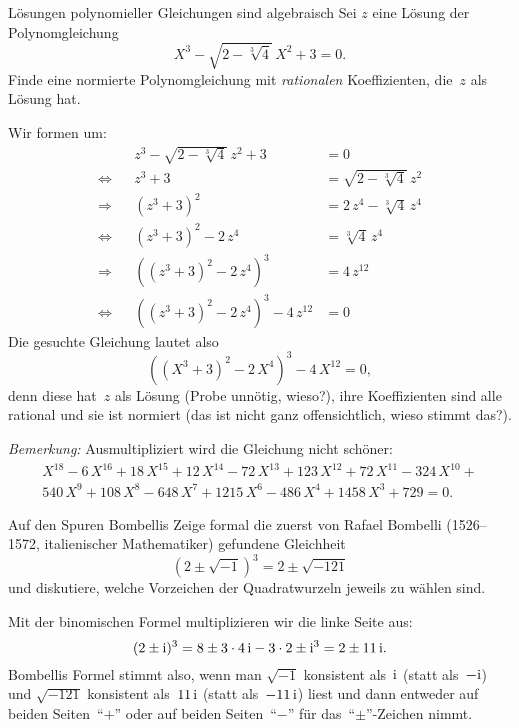 \documentclass{algblatt}
\begin{document}
\vspace*{-1.2cm}

\begin{aufgabe}{Lösungen polynomieller Gleichungen sind algebraisch}
Sei $z$ eine Lösung der Polynomgleichung
\[ X^3 - \sqrt{2 - \sqrt[3]{4}} \, X^2 + 3 = 0. \]
Finde eine normierte Polynomgleichung mit \emph{rationalen} Koeffizienten,
die~$z$ als Lösung hat.
\begin{loesung}
Wir formen um:
\begin{align*}
  &&z^3 - \sqrt{2 - \sqrt[3]{4}} \, z^2 + 3 &= 0 \\
  \Longleftrightarrow&&
  z^3 + 3 &= \sqrt{2 - \sqrt[3]{4}} \, z^2 \\
  \Longrightarrow&&
  (z^3 + 3)^2 &= 2 \, z^4 - \sqrt[3]{4} \, z^4 \\
  \Longleftrightarrow&&
  (z^3 + 3)^2 - 2 \, z^4 &= \sqrt[3]{4} \, z^4 \\
  \Longrightarrow&&
  ((z^3 + 3)^2 - 2 \, z^4)^3 &= 4 \, z^{12} \\
  \Longleftrightarrow&&
  ((z^3 + 3)^2 - 2 \, z^4)^3 - 4 \, z^{12} &= 0
\end{align*}
Die gesuchte Gleichung lautet also
\[ ((X^3 + 3)^2 - 2 \, X^4)^3 - 4 \, X^{12} = 0, \]
denn diese hat~$z$ als Lösung (Probe unnötig, wieso?), ihre Koeffizienten sind
alle rational und sie ist normiert (das ist nicht ganz offensichtlich, wieso
stimmt das?).

\emph{Bemerkung:} Ausmultipliziert wird die Gleichung nicht schöner:
\begin{multline*}
X^{18}-6\,X^{16}+18\,X^{15}+12\,X^{14}-72\,X^{13}+123\,X^{12}+72\,X^{11}-324\,X^{10}+\\540\,X^{9}
+
          108\,X^{8}-648\,X^{7}+1215\,X^{6}-486\,X^{4}+1458\,X^{3}+729=0.
\end{multline*}
\end{loesung}
\end{aufgabe}

\begin{aufgabe}{Auf den Spuren Bombellis}
Zeige formal die zuerst von Rafael Bombelli (1526--1572, italienischer
Mathematiker) gefundene
Gleichheit
\[
    (2 \pm \sqrt{-1})^3 = 2 \pm \sqrt{-121}
\]
und diskutiere, welche Vorzeichen der Quadratwurzeln jeweils zu wählen sind.
\begin{loesung}
Mit der binomischen Formel multiplizieren wir die linke Seite aus:
\[ (2 \pm \mathrm{i})^3 = 8 \pm 3 \cdot 4 \, \mathrm{i} - 3 \cdot 2 \pm \mathrm{i}^3 =
  2 \pm 11 \, \mathrm{i}. \]
Bombellis Formel stimmt also, wenn man $\sqrt{-1}$ konsistent als~$\mathrm{i}$ (statt
als~$-\mathrm{i}$) und $\sqrt{-121}$ konsistent als~$11 \,\mathrm{i}$ (statt als~$-11\,\mathrm{i}$)
liest und dann entweder auf beiden Seiten~"`$+$"' oder auf beiden Seiten~"`$-$"' für
das~"`$\pm$"'-Zeichen nimmt.
\end{loesung}
\end{aufgabe}
\end{document}
